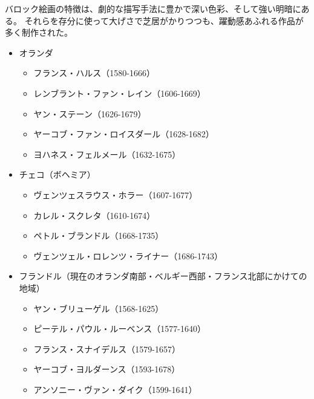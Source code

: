 \documentclass[letterpaper,10pt,dvipdfmx]{sphinxmanual}
\begin{document}
バロック絵画の特徴は、劇的な描写手法に豊かで深い色彩、そして強い明暗にある。
それらを存分に使って大げさで芝居がかりつつも、躍動感あふれる作品が多く制作された。
\begin{itemize}
\item {} 
オランダ
\begin{itemize}
\item {} 
フランス・ハルス（1580-1666）

\item {} 
レンブラント・ファン・レイン（1606-1669）

\item {} 
ヤン・ステーン（1626-1679）

\item {} 
ヤーコブ・ファン・ロイスダール（1628-1682）

\item {} 
ヨハネス・フェルメール（1632-1675）

\end{itemize}

\item {} 
チェコ（ボヘミア）
\begin{itemize}
\item {} 
ヴェンツェスラウス・ホラー（1607-1677）

\item {} 
カレル・スクレタ（1610-1674）

\item {} 
ペトル・ブランドル（1668-1735）

\item {} 
ヴェンツェル・ロレンツ・ライナー（1686-1743）

\end{itemize}

\item {} 
フランドル（現在のオランダ南部・ベルギー西部・フランス北部にかけての地域）
\begin{itemize}
\item {} 
ヤン・ブリューゲル（1568-1625）

\item {} 
ピーテル・パウル・ルーベンス（1577-1640）

\item {} 
フランス・スナイデルス（1579-1657）

\item {} 
ヤーコブ・ヨルダーンス（1593-1678）

\item {} 
アンソニー・ヴァン・ダイク（1599-1641）


\end{itemize}
\end{itemize}
\end{document}
